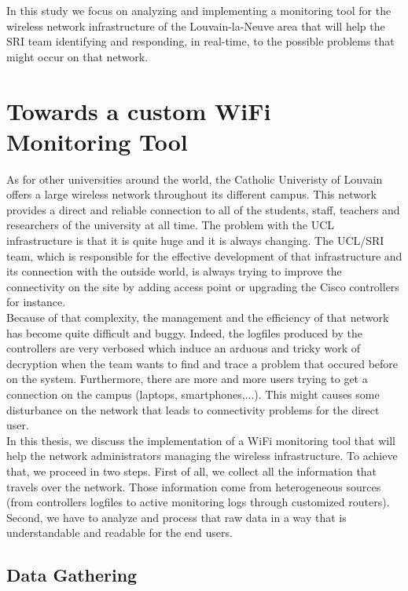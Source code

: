 In this study we focus on analyzing and implementing a monitoring tool for the wireless network infrastructure of the Louvain-la-Neuve area that will help the SRI team identifying and responding, in real-time, to the possible problems that might occur on that network.


\section{Towards a custom WiFi Monitoring Tool}
As for other universities around the world, the Catholic Univeristy of Louvain offers a large wireless network throughout its different campus. This network provides a direct and reliable connection to all of the students, staff, teachers and researchers of the university at all time. The problem with the UCL infrastructure is that it is quite huge and it is always changing. The UCL/SRI team, which is responsible for the effective development of that infrastructure and its connection with the outside world, is always trying to improve the connectivity on the site by adding access point or upgrading the Cisco controllers for instance.\\

Because of that complexity, the management and the efficiency of that network has become quite difficult and buggy. Indeed, the logfiles produced by the controllers are very verbosed which induce an arduous and tricky work of decryption when the team wants to find and trace a problem that occured before on the system. Furthermore, there are more and more users trying to get a connection on the campus (laptops, smartphones,...). This might causes some disturbance on the network that leads to connectivity problems for the direct user.\\

In this thesis, we discuss the implementation of a WiFi monitoring tool that will help the network administrators managing the wireless infrastructure. To achieve that, we proceed in two steps. First of all, we collect all the information that travels over the network. Those information come from heterogeneous sources (from controllers logfiles to active monitoring logs through customized routers). Second, we have to analyze and process that raw data in a way that is understandable and readable for the end users.

\subsection{Data Gathering}

